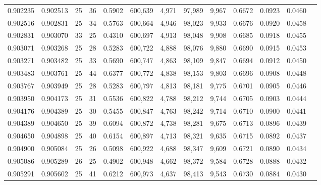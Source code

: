 \begin{tabular}{rrrrrrrrrrrrr}
0.902235 & 0.902513 &    25 &  36 &                                     0.5902 & 600,639 &   4,971 &  97,989 &   9,967 & 0.6672 & 0.0923 & 0.0460 \\
0.902516 & 0.902831 &    25 &  34 &                                     0.5763 & 600,664 &   4,946 &  98,023 &   9,933 & 0.6676 & 0.0920 & 0.0458 \\
0.902831 & 0.903070 &    33 &  25 &                                     0.4310 & 600,697 &   4,913 &  98,048 &   9,908 & 0.6685 & 0.0918 & 0.0455 \\
0.903071 & 0.903268 &    25 &  28 &                                     0.5283 & 600,722 &   4,888 &  98,076 &   9,880 & 0.6690 & 0.0915 & 0.0453 \\
0.903271 & 0.903482 &    25 &  33 &                                     0.5690 & 600,747 &   4,863 &  98,109 &   9,847 & 0.6694 & 0.0912 & 0.0450 \\
0.903483 & 0.903761 &    25 &  44 &                                     0.6377 & 600,772 &   4,838 &  98,153 &   9,803 & 0.6696 & 0.0908 & 0.0448 \\
0.903767 & 0.903949 &    25 &  28 &                                     0.5283 & 600,797 &   4,813 &  98,181 &   9,775 & 0.6701 & 0.0905 & 0.0446 \\
0.903950 & 0.904173 &    25 &  31 &                                     0.5536 & 600,822 &   4,788 &  98,212 &   9,744 & 0.6705 & 0.0903 & 0.0444 \\
0.904176 & 0.904389 &    25 &  30 &                                     0.5455 & 600,847 &   4,763 &  98,242 &   9,714 & 0.6710 & 0.0900 & 0.0441 \\
0.904389 & 0.904650 &    25 &  39 &                                     0.6094 & 600,872 &   4,738 &  98,281 &   9,675 & 0.6713 & 0.0896 & 0.0439 \\
0.904650 & 0.904898 &    25 &  40 &                                     0.6154 & 600,897 &   4,713 &  98,321 &   9,635 & 0.6715 & 0.0892 & 0.0437 \\
0.904900 & 0.905084 &    25 &  26 &                                     0.5098 & 600,922 &   4,688 &  98,347 &   9,609 & 0.6721 & 0.0890 & 0.0434 \\
0.905086 & 0.905289 &    26 &  25 &                                     0.4902 & 600,948 &   4,662 &  98,372 &   9,584 & 0.6728 & 0.0888 & 0.0432 \\
0.905291 & 0.905602 &    25 &  41 &                                     0.6212 & 600,973 &   4,637 &  98,413 &   9,543 & 0.6730 & 0.0884 & 0.0430 \\

\end{tabular}
